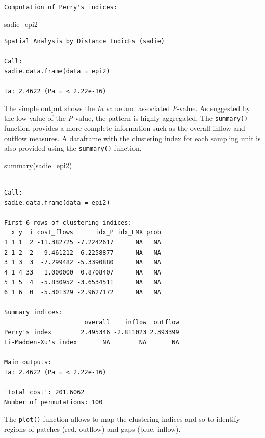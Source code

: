 \documentclass[
  letterpaper,
  DIV=11,
  numbers=noendperiod]{scrreprt}
\newenvironment{Shaded}{\begin{snugshade}}{\end{snugshade}}
\newcommand{\FunctionTok}[1]{\textcolor[rgb]{0.28,0.35,0.67}{#1}}
\newcommand{\NormalTok}[1]{\textcolor[rgb]{0.00,0.23,0.31}{#1}}
\begin{document}
\begin{verbatim}
Computation of Perry's indices:
\end{verbatim}

\begin{Shaded}
\begin{Highlighting}[]
\NormalTok{sadie\_epi2}
\end{Highlighting}
\end{Shaded}

\begin{verbatim}
Spatial Analysis by Distance IndicEs (sadie)

Call:
sadie.data.frame(data = epi2)

Ia: 2.4622 (Pa = < 2.22e-16)
\end{verbatim}

The simple output shows the \emph{Ia} value and associated
\emph{P}-value. As suggested by the low value of the \emph{P}-value, the
pattern is highly aggregated. The \texttt{summary()} function provides a
more complete information such as the overall inflow and outflow
measures. A dataframe with the clustering index for each sampling unit
is also provided using the \texttt{summary()} function.

\begin{Shaded}
\begin{Highlighting}[]
\FunctionTok{summary}\NormalTok{(sadie\_epi2)}
\end{Highlighting}
\end{Shaded}

\begin{verbatim}

Call:
sadie.data.frame(data = epi2)

First 6 rows of clustering indices:
  x y  i cost_flows      idx_P idx_LMX prob
1 1 1  2 -11.382725 -7.2242617      NA   NA
2 1 2  2  -9.461212 -6.2258877      NA   NA
3 1 3  3  -7.299482 -5.3390880      NA   NA
4 1 4 33   1.000000  0.8708407      NA   NA
5 1 5  4  -5.830952 -3.6534511      NA   NA
6 1 6  0  -5.301329 -2.9627172      NA   NA

Summary indices:
                      overall    inflow  outflow
Perry's index        2.495346 -2.811023 2.393399
Li-Madden-Xu's index       NA        NA       NA

Main outputs:
Ia: 2.4622 (Pa = < 2.22e-16)

'Total cost': 201.6062
Number of permutations: 100
\end{verbatim}

The \texttt{plot()} function allows to map the clustering indices and so
to identify regions of patches (red, outflow) and gaps (blue, inflow).
\end{document}
